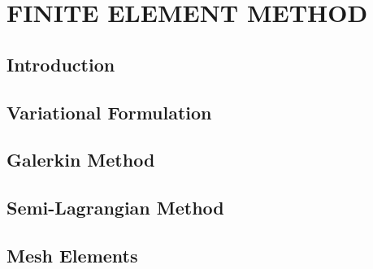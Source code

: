 \chapter{\textbf{FINITE ELEMENT METHOD}}
\label{metodo dos elementos finitos}

\section{\textbf{Introduction}} 


\section{\textbf{Variational Formulation}} 
\label{formulacao variacional}



\section{\textbf{Galerkin Method}} 
\label{discretizacao espaco}



\section{\textbf{Semi-Lagrangian Method}} 
\label{discretizacao tempo}



\section{\textbf{Mesh Elements}} 
\label{elemento}





